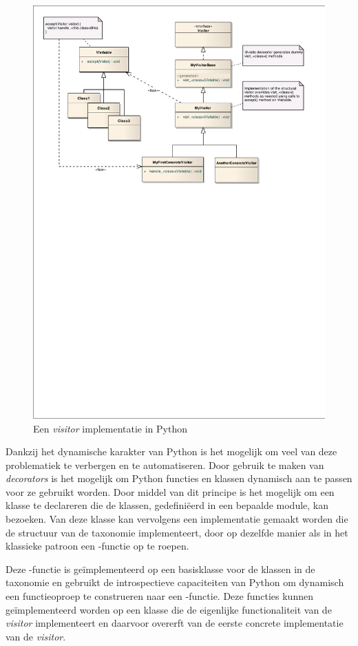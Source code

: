 \begin{figure}[ht]
  \centering
  \includegraphics[width=0.9\linewidth]{resources/py-visitor.pdf}
  \caption{Een \emph{visitor} implementatie in Python}
  \label{fig:py-visitor}
\end{figure}

Dankzij het dynamische karakter van Python is het mogelijk om veel van deze
problematiek te verbergen en te automatiseren. Door gebruik te maken van
\emph{decorators} is het mogelijk om Python functies en klassen dynamisch aan
te passen voor ze gebruikt worden. Door middel van dit principe is het mogelijk
om een klasse te declareren die de klassen, gedefini\"eerd in een bepaalde
module, kan bezoeken. Van deze klasse kan vervolgens een implementatie gemaakt
worden die de structuur van de taxonomie implementeert, door op dezelfde manier
als in het klassieke patroon een -functie op te roepen.

Deze -functie is ge\"implementeerd op een basisklasse voor de
klassen in de taxonomie en gebruikt de introspectieve capaciteiten van Python
om dynamisch een functieoproep te construeren naar een
-functie. Deze functies kunnen ge\"implementeerd worden op
een klasse die de eigenlijke functionaliteit van de \emph{visitor}
implementeert en daarvoor overerft van de eerste concrete implementatie van de
\emph{visitor}.


